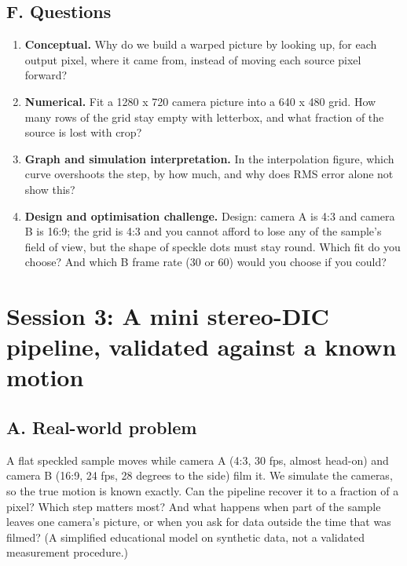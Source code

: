 \documentclass[11pt,a4paper]{article}
\begin{document}
\subsection*{F. Questions}
\begin{enumerate}[nosep]
\item \textbf{Conceptual.} Why do we build a warped picture by looking up, for each output pixel, where it came from, instead of moving each source pixel forward?
\item \textbf{Numerical.} Fit a 1280 x 720 camera picture into a 640 x 480 grid. How many rows of the grid stay empty with letterbox, and what fraction of the source is lost with crop?
\item \textbf{Graph and simulation interpretation.} In the interpolation figure, which curve overshoots the step, by how much, and why does RMS error alone not show this?
\item \textbf{Design and optimisation challenge.} Design: camera A is 4:3 and camera B is 16:9; the grid is 4:3 and you cannot afford to lose any of the sample's field of view, but the shape of speckle dots must stay round. Which fit do you choose? And which B frame rate (30 or 60) would you choose if you could?
\end{enumerate}

\section{Session 3: A mini stereo-DIC pipeline, validated against a known motion}

\subsection*{A. Real-world problem}
A flat speckled sample moves while camera A (4:3, 30 fps, almost head-on) and camera B (16:9, 24 fps, 28 degrees to the side) film it. We simulate the cameras, so the true motion is known exactly. Can the pipeline recover it to a fraction of a pixel? Which step matters most? And what happens when part of the sample leaves one camera's picture, or when you ask for data outside the time that was filmed? (A simplified educational model on synthetic data, not a validated measurement procedure.)
\end{document}
